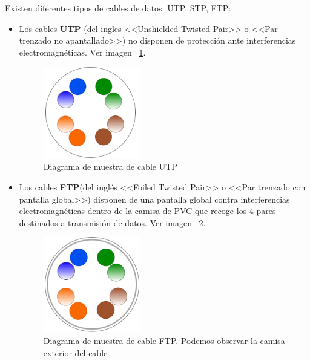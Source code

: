 Existen diferentes tipos de cables de datos: UTP, STP, FTP:
\begin{itemize}
\item Los cables \textbf{UTP} (del ingles <<Unshielded Twisted Pair>> o <<Par trenzado no apantallado>>) no disponen de protección ante interferencias electromagnéticas. Ver imagen ~\ref{Img:Muestra UTP}.

\begin{figure}
    \centering
    \includegraphics[width=0.4\textwidth]{img/UTP.pdf}
    \caption{Diagrama de muestra de cable UTP} \label{Img:Muestra UTP}
\end{figure}

\item Los cables \textbf{FTP}(del inglés <<Foiled Twisted Pair>> o <<Par trenzado con pantalla global>>) disponen de una pantalla global contra interferencias electromagnéticas dentro de la camisa de PVC que recoge los 4 pares destinados a transmisión de datos. Ver imagen ~\ref{Img:Muestra FTP}.

\begin{figure}
    \centering
    \includegraphics[width=0.4\textwidth]{img/FTP.pdf}
    \caption[Diagrama de muestra de cable FTP]{Diagrama de muestra de cable FTP. Podemos observar la camisa exterior del cable} \label{Img:Muestra FTP}
\end{figure}


\end{itemize}
